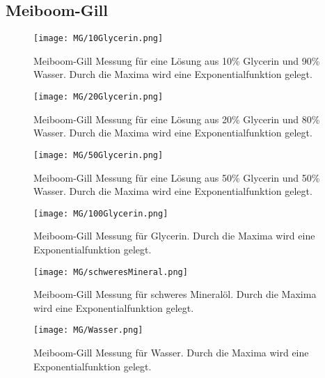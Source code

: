 \documentclass[10pt,twoside]{article}
\renewcommand{\1}{^{-1}}
\renewcommand{\2}{^{-2}}
\newcommand{\3}{^{-3}}
\newcommand{\4}{^{-4}}
\newcommand{\5}{^{-5}}
\newcommand{\6}{^{-6}}
\newcommand{\7}{^{-7}}
\newcommand{\8}{^{-8}}
\newcommand{\9}{^{-9}}
\begin{document}
\subsection{Meiboom-Gill}
\begin{figure}[H]
\centering
\texttt{[image: MG/10Glycerin.png]} 
\caption{Meiboom-Gill Messung für eine Lösung aus 10\% Glycerin und 90\% Wasser. Durch die Maxima wird eine Exponentialfunktion gelegt.}
\end{figure}
\begin{figure}[H]
\centering
\texttt{[image: MG/20Glycerin.png]} 
\caption{Meiboom-Gill Messung für eine Lösung aus 20\% Glycerin und 80\% Wasser. Durch die Maxima wird eine Exponentialfunktion gelegt.}
\end{figure}
\begin{figure}[H]
\centering
\texttt{[image: MG/50Glycerin.png]} 
\caption{Meiboom-Gill Messung für eine Lösung aus 50\% Glycerin und 50\% Wasser. Durch die Maxima wird eine Exponentialfunktion gelegt.}
\end{figure}
\begin{figure}[H]
\centering
\texttt{[image: MG/100Glycerin.png]} 
\caption{Meiboom-Gill Messung für Glycerin. Durch die Maxima wird eine Exponentialfunktion gelegt.}
\end{figure}
\begin{figure}[H]
\centering
\texttt{[image: MG/schweresMineral.png]} 
\caption{Meiboom-Gill Messung für schweres Mineralöl. Durch die Maxima wird eine Exponentialfunktion gelegt.}
\end{figure}
\begin{figure}[H]
\centering
\texttt{[image: MG/Wasser.png]} 
\caption{Meiboom-Gill Messung für Wasser. Durch die Maxima wird eine Exponentialfunktion gelegt.}
\end{figure}
\end{document}
